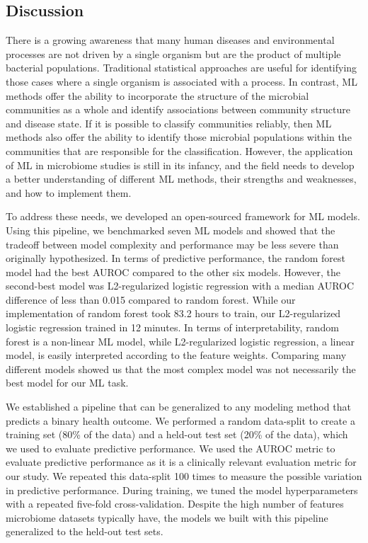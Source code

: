 \documentclass[11pt,]{article}
\begin{document}
\subsection{Discussion}\label{discussion}

There is a growing awareness that many human diseases and environmental
processes are not driven by a single organism but are the product of
multiple bacterial populations. Traditional statistical approaches are
useful for identifying those cases where a single organism is associated
with a process. In contrast, ML methods offer the ability to incorporate
the structure of the microbial communities as a whole and identify
associations between community structure and disease state. If it is
possible to classify communities reliably, then ML methods also offer
the ability to identify those microbial populations within the
communities that are responsible for the classification. However, the
application of ML in microbiome studies is still in its infancy, and the
field needs to develop a better understanding of different ML methods,
their strengths and weaknesses, and how to implement them.

To address these needs, we developed an open-sourced framework for ML
models. Using this pipeline, we benchmarked seven ML models and showed
that the tradeoff between model complexity and performance may be less
severe than originally hypothesized. In terms of predictive performance,
the random forest model had the best AUROC compared to the other six
models. However, the second-best model was L2-regularized logistic
regression with a median AUROC difference of less than 0.015 compared to
random forest. While our implementation of random forest took 83.2 hours
to train, our L2-regularized logistic regression trained in 12 minutes.
In terms of interpretability, random forest is a non-linear ML model,
while L2-regularized logistic regression, a linear model, is easily
interpreted according to the feature weights. Comparing many different
models showed us that the most complex model was not necessarily the
best model for our ML task.

We established a pipeline that can be generalized to any modeling method
that predicts a binary health outcome. We performed a random data-split
to create a training set (80\% of the data) and a held-out test set
(20\% of the data), which we used to evaluate predictive performance. We
used the AUROC metric to evaluate predictive performance as it is a
clinically relevant evaluation metric for our study. We repeated this
data-split 100 times to measure the possible variation in predictive
performance. During training, we tuned the model hyperparameters with a
repeated five-fold cross-validation. Despite the high number of features
microbiome datasets typically have, the models we built with this
pipeline generalized to the held-out test sets.
\end{document}
